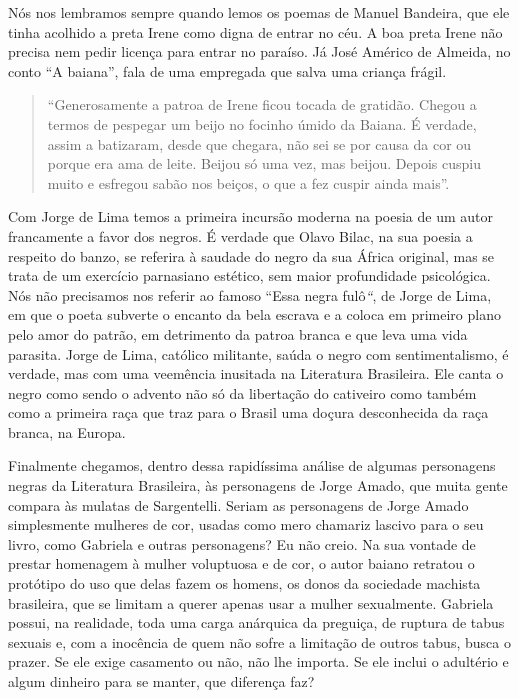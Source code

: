 \documentclass[
  letterpaper,
  DIV=11,
  numbers=noendperiod]{scrreprt}
\begin{document}
Nós nos lembramos sempre quando lemos os poemas de Manuel Bandeira, que
ele tinha acolhido a preta Irene como digna de entrar no céu. A boa
preta Irene não precisa nem pedir licença para entrar no paraíso. Já
José Américo de Almeida, no conto ``A baiana'', fala de uma empregada
que salva uma criança frágil.

\begin{quote}
``Generosamente a patroa de Irene ficou tocada de gratidão. Chegou a
termos de pespegar um beijo no focinho úmido da Baiana. É verdade, assim
a batizaram, desde que chegara, não sei se por causa da cor ou porque
era ama de leite. Beijou só uma vez, mas beijou. Depois cuspiu muito e
esfregou sabão nos beiços, o que a fez cuspir ainda mais''.
\end{quote}

Com Jorge de Lima temos a primeira incursão moderna na poesia de um
autor francamente a favor dos negros. É verdade que Olavo Bilac, na sua
poesia a respeito do banzo, se referira à saudade do negro da sua África
original, mas se trata de um exercício parnasiano estético, sem maior
profundidade psicológica. Nós não precisamos nos referir ao famoso
``Essa negra fulô\emph{``}, de Jorge de Lima, em que o poeta subverte o
encanto da bela escrava e a coloca em primeiro plano pelo amor do
patrão, em detrimento da patroa branca e que leva uma vida parasita.
Jorge de Lima, católico militante, saúda o negro com sentimentalismo, é
verdade, mas com uma veemência inusitada na Literatura Brasileira. Ele
canta o negro como sendo o advento não só da libertação do cativeiro
como também como a primeira raça que traz para o Brasil uma doçura
desconhecida da raça branca, na Europa.

Finalmente chegamos, dentro dessa rapidíssima análise de algumas
personagens negras da Literatura Brasileira, às personagens de Jorge
Amado, que muita gente compara às mulatas de Sargentelli. Seriam as
personagens de Jorge Amado simplesmente mulheres de cor, usadas como
mero chamariz lascivo para o seu livro, como Gabriela e outras
personagens? Eu não creio. Na sua vontade de prestar homenagem à mulher
voluptuosa e de cor, o autor baiano retratou o protótipo do uso que
delas fazem os homens, os donos da sociedade machista brasileira, que se
limitam a querer apenas usar a mulher sexualmente. Gabriela possui, na
realidade, toda uma carga anárquica da preguiça, de ruptura de tabus
sexuais e, com a inocência de quem não sofre a limitação de outros
tabus, busca o prazer. Se ele exige casamento ou não, não lhe importa.
Se ele inclui o adultério e algum dinheiro para se manter, que diferença
faz?
\end{document}
